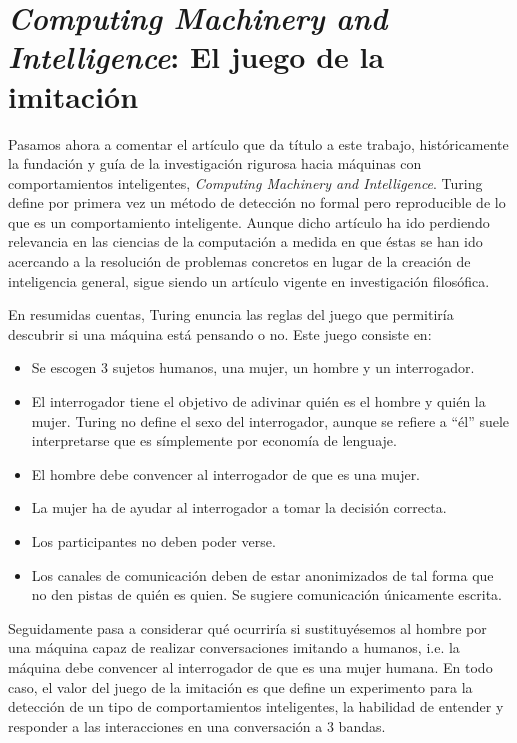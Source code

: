 \documentclass[12pt]{memoir}
\begin{document}
\section[\textit{Computing Machinery and Intelligence}: El juego de la imitación]{\textit{Computing Machinery and Intelligence}: El juego de la imitación}
\label{computingmachineryandintelligence}

Pasamos ahora a comentar el artículo que da título a este trabajo, históricamente la fundación y guía \parencite{turingHarmful} de la investigación rigurosa hacia máquinas con comportamientos inteligentes, \textit{Computing Machinery and Intelligence}. Turing define por primera vez un método de detección no formal pero reproducible de lo que es un comportamiento inteligente. Aunque dicho artículo ha ido perdiendo relevancia en las ciencias de la computación a medida en que éstas se han ido acercando a la resolución de problemas concretos en lugar de la creación de inteligencia general, sigue siendo un artículo vigente en investigación filosófica.

En resumidas cuentas, Turing enuncia las reglas del juego que permitiría descubrir si una máquina está pensando o no. Este juego consiste en: 
\begin{itemize}
    \item Se escogen 3 sujetos humanos, una mujer, un hombre y un interrogador.
    \item El interrogador tiene el objetivo de adivinar quién es el hombre y quién la mujer. Turing no define el sexo del interrogador, aunque se refiere a ``él'' suele interpretarse que es símplemente por economía de lenguaje.
    \item El hombre debe convencer al interrogador de que es una mujer.
    \item La mujer ha de ayudar al interrogador a tomar la decisión correcta.
    \item Los participantes no deben poder verse.
    \item Los canales de comunicación deben de estar anonimizados de tal forma que no den pistas de quién es quien. Se sugiere comunicación únicamente escrita.
\end{itemize}

Seguidamente pasa a considerar qué ocurriría si sustituyésemos al hombre por una máquina capaz de realizar conversaciones imitando a humanos, i.e. la máquina debe convencer al interrogador de que es una mujer humana. En todo caso, el valor del juego de la imitación es que define un experimento para la detección de un tipo de comportamientos inteligentes, la habilidad de entender y responder a las interacciones en una conversación a 3 bandas.
\end{document}
